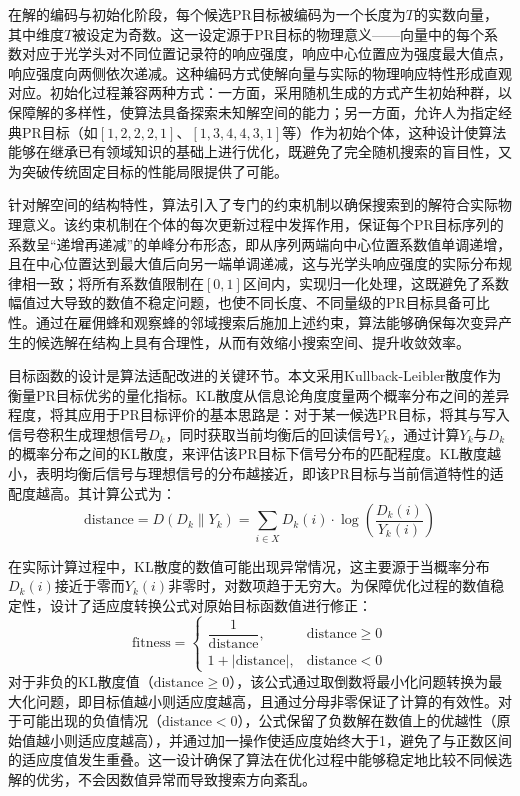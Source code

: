 在解的编码与初始化阶段，每个候选PR目标被编码为一个长度为$T$的实数向量，其中维度$T$被设定为奇数。这一设定源于PR目标的物理意义——向量中的每个系数对应于光学头对不同位置记录符的响应强度，响应中心位置应为强度最大值点，响应强度向两侧依次递减。这种编码方式使解向量与实际的物理响应特性形成直观对应。初始化过程兼容两种方式：一方面，采用随机生成的方式产生初始种群，以保障解的多样性，使算法具备探索未知解空间的能力；另一方面，允许人为指定经典PR目标（如$[1,2,2,2,1]$、$[1,3,4,4,3,1]$等）作为初始个体，这种设计使算法能够在继承已有领域知识的基础上进行优化，既避免了完全随机搜索的盲目性，又为突破传统固定目标的性能局限提供了可能。

针对解空间的结构特性，算法引入了专门的约束机制以确保搜索到的解符合实际物理意义。该约束机制在个体的每次更新过程中发挥作用，保证每个PR目标序列的系数呈“递增再递减”的单峰分布形态，即从序列两端向中心位置系数值单调递增，且在中心位置达到最大值后向另一端单调递减，这与光学头响应强度的实际分布规律相一致；将所有系数值限制在$[0,1]$区间内，实现归一化处理，这既避免了系数幅值过大导致的数值不稳定问题，也使不同长度、不同量级的PR目标具备可比性。通过在雇佣蜂和观察蜂的邻域搜索后施加上述约束，算法能够确保每次变异产生的候选解在结构上具有合理性，从而有效缩小搜索空间、提升收敛效率。

目标函数的设计是算法适配改进的关键环节。本文采用Kullback-Leibler散度作为衡量PR目标优劣的量化指标。KL散度从信息论角度度量两个概率分布之间的差异程度，将其应用于PR目标评价的基本思路是：对于某一候选PR目标，将其与写入信号卷积生成理想信号$D_k$，同时获取当前均衡后的回读信号$Y_k$，通过计算$Y_k$与$D_k$的概率分布之间的KL散度，来评估该PR目标下信号分布的匹配程度。KL散度越小，表明均衡后信号与理想信号的分布越接近，即该PR目标与当前信道特性的适配度越高。其计算公式为：
\begin{equation}
	\text{distance} = D(D_k \parallel Y_k) = \sum_{i \in X} D_k(i) \cdot \log \left( \frac{D_k(i)}{Y_k(i)} \right)
\end{equation}

在实际计算过程中，KL散度的数值可能出现异常情况，这主要源于当概率分布$D_k(i)$接近于零而$Y_k(i)$非零时，对数项趋于无穷大。为保障优化过程的数值稳定性，设计了适应度转换公式对原始目标函数值进行修正：
\[
\text{fitness} = 
\begin{cases} 
	\dfrac{1}{\text{distance}}, & \text{distance} \geq 0 \\[1.2ex]
	1 + |\text{distance}|, & \text{distance} < 0 
\end{cases}
\]
对于非负的KL散度值（$\text{distance} \geq 0$），该公式通过取倒数将最小化问题转换为最大化问题，即目标值越小则适应度越高，且通过分母非零保证了计算的有效性。对于可能出现的负值情况（$\text{distance} < 0$），公式保留了负数解在数值上的优越性（原始值越小则适应度越高），并通过加一操作使适应度始终大于1，避免了与正数区间的适应度值发生重叠。这一设计确保了算法在优化过程中能够稳定地比较不同候选解的优劣，不会因数值异常而导致搜索方向紊乱。


